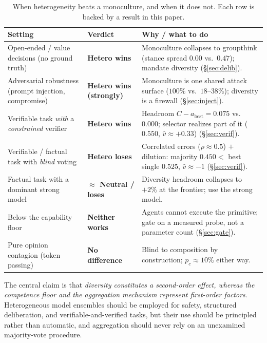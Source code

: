 \documentclass[manuscript,screen,review]{acmart}
\newcommand{\rev}[1]{\textcolor{revblue}{#1}}
\begin{document}
\begin{table}[t]
\caption{When heterogeneity beats a monoculture, and when it does not. Each row is backed by
a result in this paper.}
\label{tab:verdict}
\small
\begin{tabular}{@{}p{2.9cm}p{1.5cm}p{4.7cm}@{}}
\toprule
\textbf{Setting} & \textbf{Verdict} & \textbf{Why / what to do} \\
\midrule
Open-ended / value decisions (no ground truth) & \textbf{Hetero wins} & Monoculture collapses to groupthink (stance spread $0.00$ vs.\ $0.47$); mandate diversity (\S\ref{sec:delib}). \\
Adversarial robustness (prompt injection, compromise) & \textbf{Hetero wins (strongly)} & Monoculture is one shared attack surface ($100\%$ vs.\ $18$--$38\%$); diversity is a firewall (\S\ref{sec:inject}). \\
\rev{Verifiable task \emph{with} a \emph{constrained} verifier} & \rev{\textbf{Hetero wins}} & \rev{Headroom $C{-}a_{\mathrm{best}}{=}0.075$ vs.\ $0.000$; selector realizes part of it ($0.550$, $\hat v{\approx}{+}0.33$) (\S\ref{sec:verif}).} \\
Verifiable / factual task with \emph{blind} voting & \textbf{Hetero loses} & Correlated errors ($\rho{\approx}0.5$) $+$ dilution: majority $0.450 <$ best single $0.525$, $\hat v{\approx}{-}1$ (\S\ref{sec:verif}). \\
Factual task with a dominant strong model & \textbf{$\approx$ Neutral / loses} & Diversity headroom collapses to $+2\%$ at the frontier; use the strong model. \\
\rev{Below the capability floor} & \rev{\textbf{Neither works}} & \rev{Agents cannot execute the primitive; gate on a measured probe, not a parameter count (\S\ref{sec:gate}).} \\
Pure opinion contagion (token passing) & \textbf{No difference} & Blind to composition by construction; $p_c{\approx}10\%$ either way. \\
\bottomrule
\end{tabular}
\end{table}

The central claim is that \emph{diversity constitutes a second-order effect, whereas the competence floor and the aggregation mechanism represent first-order factors}. Heterogeneous model ensembles should be employed for safety, structured deliberation, and verifiable-and-verified tasks, but their use should be principled rather than automatic, and aggregation should never rely on an unexamined majority-vote procedure. 
\end{document}
